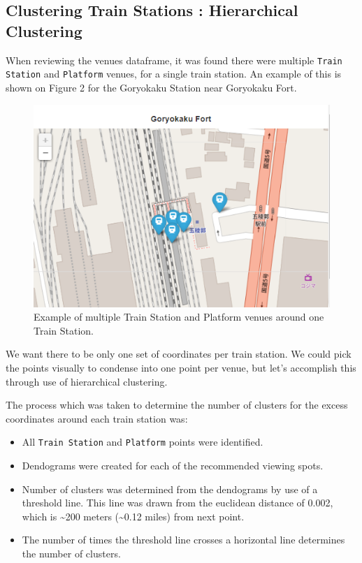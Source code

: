 \documentclass[11pt]{article}
\providecommand{\tightlist}{%
      \setlength{\itemsep}{0pt}\setlength{\parskip}{0pt}}
\begin{document}
    \hypertarget{clustering-train-stations-hierarchical-clustering}{%
\subsection{Clustering Train Stations : Hierarchical
Clustering}\label{clustering-train-stations-hierarchical-clustering}}

When reviewing the venues dataframe, it was found there were multiple \texttt{Train Station} and \texttt{Platform} venues,
for a single train station. An example of this is shown on Figure 2 for the Goryokaku Station near Goryokaku Fort. 

\begin{figure}[H]
  \centering
\includegraphics[]{images/TrainClusterExample.png}
\caption{Example of multiple Train Station and Platform venues around one Train Station.}
\end{figure}

We want there to be only one set of coordinates per train station. We could pick the points visually to condense into one point
per venue, but let's accomplish this through use of hierarchical clustering.

The process which was taken to determine the number of clusters for the excess coordinates 
around each train station was:

\begin{itemize}
  \tightlist
  \item All \texttt{Train\ Station} and \texttt{Platform} points were identified. 
  \item Dendograms were created for each of the recommended viewing spots. 
  \item Number of clusters was determined from the dendograms by use of a threshold line. This line was drawn from the euclidean distance of 
  0.002, which is \textasciitilde200 meters (\textasciitilde0.12 miles) from next point. 
  \item The number of times the threshold line crosses a horizontal line determines the number of clusters.
\end{itemize}
\end{document}
